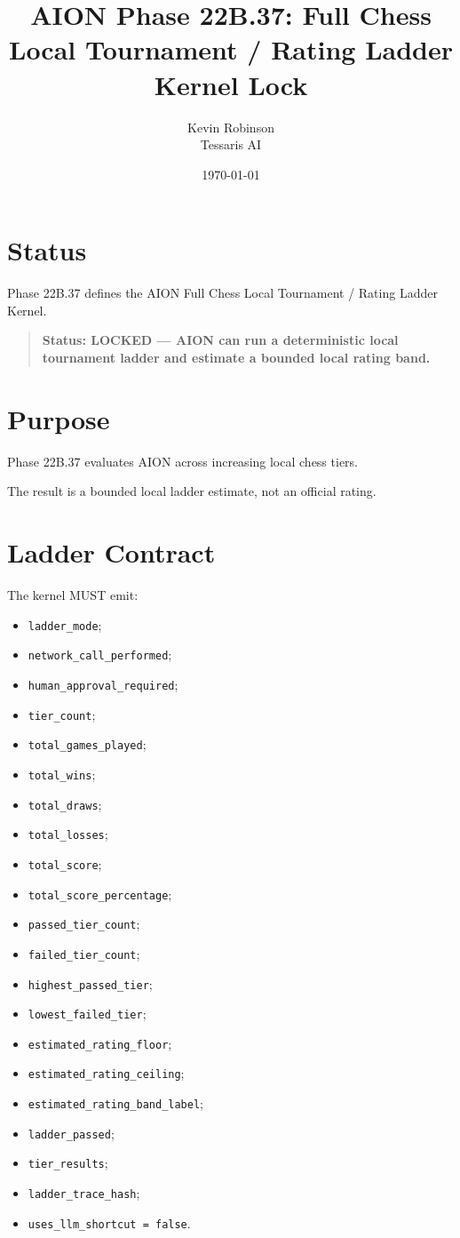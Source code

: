 \documentclass[11pt,a4paper]{article}
\title{\textbf{AION Phase 22B.37: Full Chess Local Tournament / Rating Ladder Kernel Lock}}
\author{Kevin Robinson\\Tessaris AI}
\date{\today}
\begin{document}
\maketitle

\section{Status}

Phase 22B.37 defines the AION Full Chess Local Tournament / Rating Ladder Kernel.

\begin{quote}
\textbf{Status: LOCKED --- AION can run a deterministic local tournament ladder and estimate a bounded local rating band.}
\end{quote}

\section{Purpose}

Phase 22B.37 evaluates AION across increasing local chess tiers.

The result is a bounded local ladder estimate, not an official rating.

\section{Ladder Contract}

The kernel MUST emit:

\begin{itemize}
  \item \texttt{ladder\_mode};
  \item \texttt{network\_call\_performed};
  \item \texttt{human\_approval\_required};
  \item \texttt{tier\_count};
  \item \texttt{total\_games\_played};
  \item \texttt{total\_wins};
  \item \texttt{total\_draws};
  \item \texttt{total\_losses};
  \item \texttt{total\_score};
  \item \texttt{total\_score\_percentage};
  \item \texttt{passed\_tier\_count};
  \item \texttt{failed\_tier\_count};
  \item \texttt{highest\_passed\_tier};
  \item \texttt{lowest\_failed\_tier};
  \item \texttt{estimated\_rating\_floor};
  \item \texttt{estimated\_rating\_ceiling};
  \item \texttt{estimated\_rating\_band\_label};
  \item \texttt{ladder\_passed};
  \item \texttt{tier\_results};
  \item \texttt{ladder\_trace\_hash};
  \item \texttt{uses\_llm\_shortcut = false}.
\end{itemize}
\end{document}
